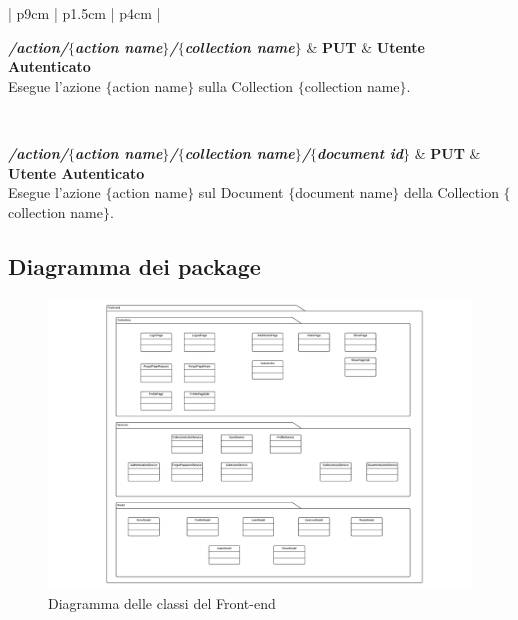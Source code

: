 \begin{center}
\begin{longtable}{| p{9cm} | p{1.5cm} | p{4cm} |}
	 {} \\ \hline
	
	\textbf{\emph{/action/$\{$action name$\}$/$\{$collection name$\}$}} & \textbf{PUT} & \textbf{Utente Autenticato} \\ \hline
	 {Esegue l'azione $\{$action name$\}$ sulla Collection $\{$collection name$\}$.}  \\ 
	\specialrule{1pt}{1pt}{1pt}
	
	 {} \\ \hline
	
	\textbf{\emph{/action/$\{$action name$\}$/$\{$collection name$\}$/$\{$document id$\}$}} & \textbf{PUT} & \textbf{Utente Autenticato} \\ \hline
	 {Esegue l'azione $\{$action name$\}$ sul Document $\{$document name$\}$ della Collection 
	$\{$collection name$\}$.}  \\ 
	\specialrule{1pt}{1pt}{1pt}

	
\end{longtable}
	  \egroup
\end{center}

\subsection{Diagramma dei package}

\begin{figure}[H]
\centering
\includegraphics[width=\textwidth]{uml/Front-end-Diagramma delle classi.png}
\caption{Diagramma delle classi del Front-end}
\label{diagrammaClassiFrontEnd}
\end{figure}

